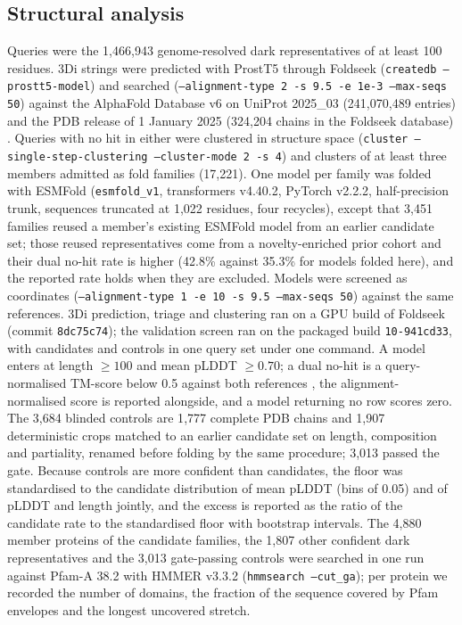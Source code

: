 \documentclass[11pt]{article}
\begin{document}
\subsection*{Structural analysis}
Queries were the 1{,}466{,}943 genome-resolved dark representatives of at least 100 residues. 3Di
strings were predicted with ProstT5 \citep{heinzinger2024prostt5} through Foldseek
\citep{vankempen2024foldseek} (\texttt{createdb --prostt5-model}) and searched
(\texttt{--alignment-type 2 -s 9.5 -e 1e-3 --max-seqs 50}) against the AlphaFold Database v6 on
UniProt 2025\_03 (241{,}070{,}489 entries) \citep{varadi2024alphafolddb} and the PDB release of 1
January 2025 (324{,}204 chains in the Foldseek database) \citep{berman2000pdb}. Queries with no hit
in either were clustered in structure space (\texttt{cluster --single-step-clustering --cluster-mode
2 -s 4}) and clusters of at least three members admitted as fold families (17{,}221). One model per
family was folded with ESMFold \citep{lin2023esmfold} (\texttt{esmfold\_v1}, transformers v4.40.2,
PyTorch v2.2.2, half-precision trunk, sequences truncated at 1{,}022 residues, four recycles), except
that 3{,}451 families reused a member's existing ESMFold model from an earlier candidate set; those
reused representatives come from a novelty-enriched prior cohort and their dual no-hit rate is higher
(42.8\% against 35.3\% for models folded here), and the reported rate holds when they are excluded.
Models were screened as coordinates (\texttt{--alignment-type 1 -e 10 -s 9.5 --max-seqs 50})
against the same references. 3Di prediction, triage and clustering ran on a GPU build of Foldseek
(commit \texttt{8dc75c74}); the validation screen ran on the packaged build \texttt{10-941cd33},
with candidates and controls in one query set under one command. A model enters at length
$\geq 100$ and mean pLDDT $\geq 0.70$; a dual no-hit is a query-normalised TM-score below 0.5 against
both references \citep{zhang2004tmscore}, the alignment-normalised score is reported alongside, and a
model returning no row scores zero. The 3{,}684 blinded controls are 1{,}777 complete PDB chains and
1{,}907 deterministic crops matched to an earlier candidate set on length, composition and
partiality, renamed before folding by the same procedure; 3{,}013 passed the gate. Because controls
are more confident than candidates, the floor was standardised to the candidate distribution of
mean pLDDT (bins of 0.05) and of pLDDT and length jointly, and the excess is reported as the ratio of
the candidate rate to the standardised floor with bootstrap intervals. The 4{,}880 member proteins of
the candidate families, the 1{,}807 other confident dark representatives and the 3{,}013 gate-passing
controls were searched in one run against Pfam-A 38.2 with HMMER v3.3.2 (\texttt{hmmsearch --cut\_ga});
per protein we recorded the number of domains, the fraction of the sequence covered by Pfam
envelopes and the longest uncovered stretch.
\end{document}
